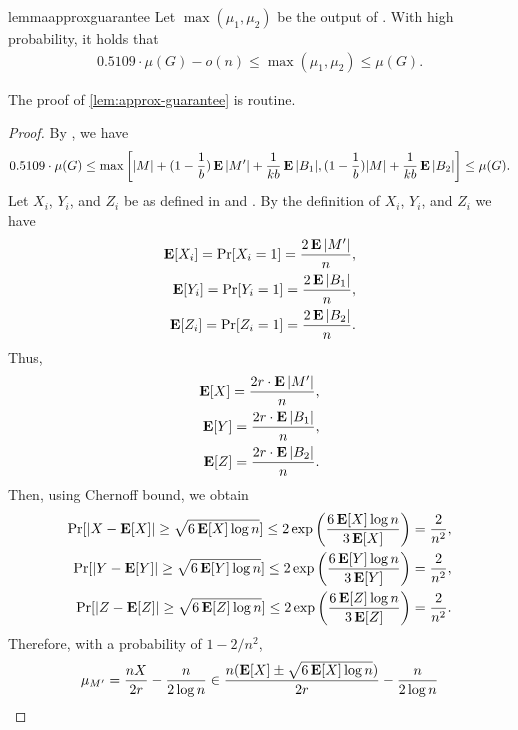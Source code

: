 \documentclass[letterpaper,11pt]{article}
\DeclareMathOperator{\E}{\ensuremath{\normalfont \textbf{E}}}
\DeclareMathOperator*{\Prob}{\ensuremath{\textnormal{Pr}}}
\renewcommand{\Pr}{\Prob}
\begin{document}
\begin{restatable}{lemma}{approxguarantee}
\label{lem:approx-guarantee}
    Let $\max(\mu_1, \mu_2)$ be the output of . With high probability, it holds that
    \begin{align*}
        0.5109\cdot \mu(G) - o(n) \leq \max(\mu_1, \mu_2) \leq \mu(G).
    \end{align*}
\end{restatable}
The proof of \cref{lem:approx-guarantee} is routine.
\begin{proof}
    By , we have
    \begin{align}\label{eq:range-estimate}
        0.5109  \cdot\mu(G) \leq \max \left[|M| + (1 - \frac{1}{b}) \E|M'| + \frac{1}{kb} \E|B_1|, (1 - \frac{1}{b}) |M| + \frac{1}{kb} \E|B_2| \right] \leq \mu(G).
    \end{align}
    Let $X_i$, $Y_i$, and $Z_i$ be as defined in  and . By the definition of $X_i$, $Y_i$, and $Z_i$ we have
    \begin{align*}
        \E[X_i] = \Pr[X_i = 1] = \frac{2\E|M'|}{n},\\
        \E[Y_i] = \Pr[Y_i = 1] = \frac{2\E|B_1|}{n},\\
        \E[Z_i] = \Pr[Z_i = 1] = \frac{2\E|B_2|}{n}.
    \end{align*}
    Thus,
    \begin{align*}
        \E[X] = \frac{2r \cdot \E|M'|}{n},\\
        \E[Y] = \frac{2r \cdot \E|B_1|}{n},\\
        \E[Z] = \frac{2r \cdot \E|B_2|}{n}.
    \end{align*}
    Then, using Chernoff bound, we obtain
    \begin{align*}
        \Pr[|X - \E[X]| \geq \sqrt{6\E[X]\log n}] \leq 2\exp\left( \frac{6 \E[X] \log n}{3\E[X]}\right) = \frac{2}{n^2},\\
        \Pr[|Y - \E[Y]| \geq \sqrt{6\E[Y]\log n}] \leq 2\exp\left( \frac{6 \E[Y] \log n}{3\E[Y]}\right) = \frac{2}{n^2},\\
        \Pr[|Z - \E[Z]| \geq \sqrt{6\E[Z]\log n}] \leq 2\exp\left( \frac{6 \E[Z] \log n}{3\E[Z]}\right) = \frac{2}{n^2}.
    \end{align*}
    Therefore, with a probability of $1-2/n^2$,
    \begin{align*}
        \mu_{M'} = \frac{nX}{2r} - \frac{n}{2\log n} &\in \frac{n(\E[X] \pm \sqrt{6\E[X]\log n})}{2r} - \frac{n}{2\log n}\\

\end{align*}
\end{proof}
\end{document}
